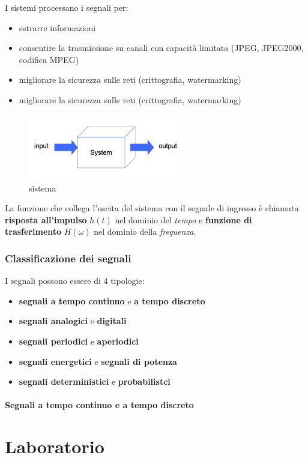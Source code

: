 \documentclass[a4paper, 12pt]{book}
\begin{document}
    I sistemi processano i segnali per:
    \begin{itemize}
      \item estrarre informazioni
      \item consentire la trasmissione su canali con capacità limitata (JPEG, JPEG2000, codifica MPEG)
      \item migliorare la sicurezza sulle reti (crittografia, watermarking)
      \item migliorare la sicurezza sulle reti (crittografia, watermarking)
    \end{itemize}

    \begin{figure}[h]
      \centering
      \includegraphics[width=0.6\textwidth, keepaspectratio]{foto/sistema.png}
      \caption{sistema}
    \end{figure}

    La funzione che collega l'uscita del sistema con il segnale di ingresso è chiamata \textbf{risposta all'impulso} $h(t)$ nel dominio del \textit{tempo} e \textbf{funzione di trasferimento} $H(\omega)$ nel dominio della \textit{frequenza}. 

    \subsection*{Classificazione dei segnali}
    I segnali possono essere di 4 tipologie:
    \begin{itemize}
      \item \textbf{segnali a tempo continuo} e \textbf{a tempo discreto}
      \item \textbf{segnali analogici} e \textbf{digitali}
      \item \textbf{segnali periodici} e \textbf{aperiodici}
      \item \textbf{segnali energetici} e \textbf{segnali di potenza}
      \item \textbf{segnali deterministici} e \textbf{probabilistci}
    \end{itemize}

    \subsubsection*{Segnali a tempo continuo e a tempo discreto}







    \chapter*{Laboratorio}
\end{document}
